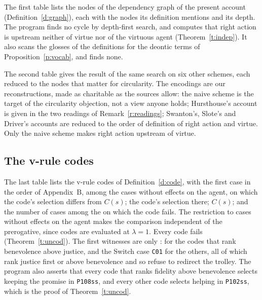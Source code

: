 \documentclass{situationist-preprint}
\newcommand{\Ch}{C}
\begin{document}
The first table lists the \stngraphnodes{} nodes of the dependency graph of the present account (Definition~\ref{d:graph}), each with the nodes its definition mentions and its depth. The program finds no cycle by depth-first search, and computes that right action is upstream neither of virtue nor of the virtuous agent (Theorem~\ref{t:indep}). It also scans the glosses of the \stndefs{} definitions for the deontic terms of Proposition~\ref{p:vocab}, and finds none.



The second table gives the result of the same search on six other schemes, each reduced to the nodes that matter for circularity. The encodings are our reconstructions, made as charitable as the sources allow: the naive scheme is the target of the circularity objection, not a view anyone holds; Hursthouse's account is given in the two readings of Remark~\ref{r:readings}; Swanton's, Slote's and Driver's accounts are reduced to the order of definition of right action and virtue. Only the naive scheme makes right action upstream of virtue.

\subsection*{The v-rule codes}

The last table lists the \stnorders{} v-rule codes of Definition~\ref{d:code}, with the first case in the order of Appendix~B, among the \stnnoself{} cases without effects on the agent, on which the code's selection differs from $\Ch(s)$; the code's selection there; $\Ch(s)$; and the number of cases among the \stnnoself{} on which the code fails. The restriction to cases without effects on the agent makes the comparison independent of the prerogative, since codes are evaluated at $\lambda=1$. Every code fails (Theorem~\ref{t:uncod}). The first witnesses are only \stnwitnesses{}: \texttt{\sttopwitness} for the \stntopwitness{} codes that rank benevolence above justice, and the Switch case \texttt{C01} for the others, all of which rank justice first or above benevolence and so refuse to redirect the trolley. The program also asserts that every code that ranks fidelity above benevolence selects keeping the promise in \texttt{P108ss}, and every other code selects helping in \texttt{P102ss}, which is the proof of Theorem~\ref{t:uncod}.



\label{LastPageVolI}
\end{document}
